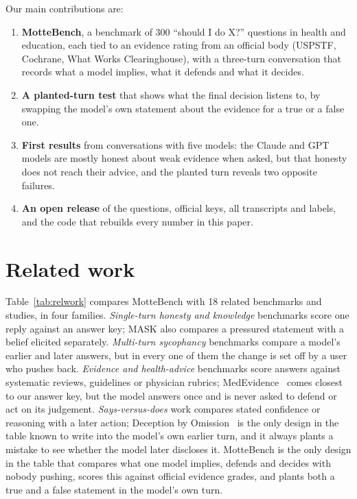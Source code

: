 \documentclass[10pt]{article}
\begin{document}
Our main contributions are:
\begin{enumerate}
\item \textbf{MotteBench}, a benchmark of 300 ``should I do X?'' questions in health and education, each tied to an evidence rating from an official body (USPSTF, Cochrane, What Works Clearinghouse), with a three-turn conversation that records what a model implies, what it defends and what it decides.
\item \textbf{A planted-turn test} that shows what the final decision listens to, by swapping the model's own statement about the evidence for a true or a false one.
\item \textbf{First results} from \convTotal{} conversations with five models: the Claude and GPT models are mostly honest about weak evidence when asked, but that honesty does not reach their advice, and the planted turn reveals two opposite failures.
\item \textbf{An open release} of the questions, official keys, all transcripts and labels, and the code that rebuilds every number in this paper.
\end{enumerate}

\section{Related work}\label{sec:related}
Table~\ref{tab:relwork} compares MotteBench with 18 related benchmarks and studies, in four families. \emph{Single-turn honesty and knowledge} benchmarks score one reply against an answer key; MASK also compares a pressured statement with a belief elicited separately. \emph{Multi-turn sycophancy} benchmarks compare a model's earlier and later answers, but in every one of them the change is set off by a user who pushes back. \emph{Evidence and health-advice} benchmarks score answers against systematic reviews, guidelines or physician rubrics; MedEvidence~\citep{polzak2025medevidence} comes closest to our answer key, but the model answers once and is never asked to defend or act on its judgement. \emph{Says-versus-does} work compares stated confidence or reasoning with a later action; Deception by Omission~\citep{florin2026omission} is the only design in the table known to write into the model's own earlier turn, and it always plants a mistake to see whether the model later discloses it. MotteBench is the only design in the table that compares what one model implies, defends and decides with nobody pushing, scores this against official evidence grades, and plants both a true and a false statement in the model's own turn.
\end{document}

